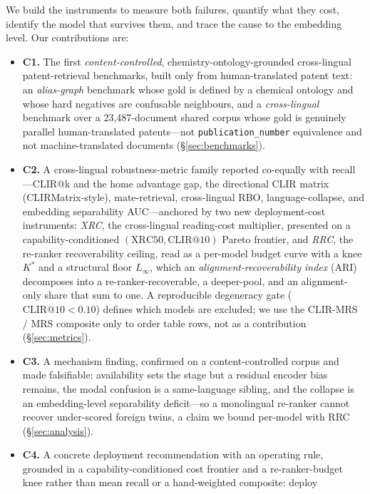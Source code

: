 \documentclass[11pt]{article}
\begin{document}
We build the instruments to measure both failures, quantify what they cost,
identify the model that survives them, and trace the cause to the embedding
level. Our contributions are:

\begin{itemize}
  \item \textbf{C1.} The first \emph{content-controlled},
  chemistry-ontology-grounded cross-lingual patent-retrieval benchmarks, built
  only from human-translated patent text: an \emph{alias-graph} benchmark whose
  gold is defined by a chemical ontology and whose hard negatives are confusable
  neighbours, and a \emph{cross-lingual} benchmark over a 23{,}487-document
  shared corpus whose gold is genuinely parallel human-translated patents---not
  \texttt{publication\_number} equivalence and not machine-translated documents
  (\S\ref{sec:benchmarks}).
  \item \textbf{C2.} A cross-lingual robustness-metric family reported
  co-equally with recall---CLIR@k and the home advantage gap, the directional
  CLIR matrix (CLIRMatrix-style), mate-retrieval, cross-lingual RBO,
  language-collapse, and embedding separability AUC---anchored by two new
  deployment-cost instruments: \emph{XRC}, the cross-lingual reading-cost
  multiplier, presented on a capability-conditioned $(\mathrm{XRC50},
  \mathrm{CLIR@10})$ Pareto frontier, and \emph{RRC}, the re-ranker
  recoverability ceiling, read as a per-model budget curve with a knee $K^{\!*}$
  and a structural floor $L_\infty$, which an \emph{alignment-recoverability
  index} (ARI) decomposes into a re-ranker-recoverable, a deeper-pool, and an
  alignment-only share that sum to one. A reproducible degeneracy gate
  ($\mathrm{CLIR@10}<0.10$) defines which models are excluded; we use the
  CLIR-MRS / MRS composite only to order table rows, not as a contribution
  (\S\ref{sec:metrics}).
  \item \textbf{C3.} A mechanism finding, confirmed on a content-controlled
  corpus and made falsifiable: availability sets the stage but a residual
  encoder bias remains, the modal confusion is a same-language sibling, and the
  collapse is an embedding-level separability deficit---so a monolingual
  re-ranker cannot recover under-scored foreign twins, a claim we bound
  per-model with RRC (\S\ref{sec:analysis}).
  \item \textbf{C4.} A concrete deployment recommendation with an operating
  rule, grounded in a capability-conditioned cost frontier and a re-ranker-budget
  knee rather than mean recall or a hand-weighted composite: deploy

\end{itemize}
\end{document}
